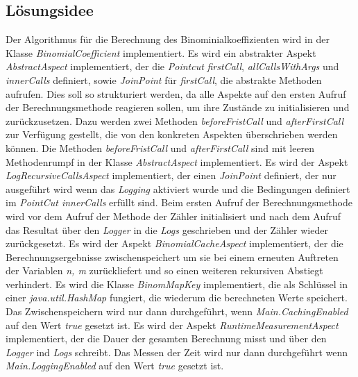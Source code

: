 \documentclass[11pt, a4paper, twoside]{article}   	%
\begin{document}
\subsection{Lösungsidee} 
Der Algorithmus für die Berechnung des Binominialkoeffizienten wird in der Klasse \emph{BinomialCoefficient} implementiert.
\newline
\newline
Es wird ein abstrakter Aspekt \emph{AbstractAspect} implementiert, der die \emph{Pointcut} \emph{firstCall}, \emph{allCallsWithArgs} und \emph{innerCalls} definiert, sowie \emph{JoinPoint} für \emph{firstCall}, die abstrakte Methoden aufrufen. Dies soll so strukturiert werden, da alle Aspekte auf den ersten Aufruf der Berechnungsmethode reagieren sollen, um ihre Zustände zu initialisieren und zurückzusetzen. Dazu werden zwei Methoden \emph{beforeFristCall} und \emph{afterFirstCall} zur Verfügung gestellt, die von den konkreten Aspekten überschrieben werden können. Die Methoden \emph{beforeFristCall} und \emph{afterFirstCall} sind mit leeren Methodenrumpf in der Klasse \emph{AbstractAspect} implementiert. 
\newline
\newline
Es wird der Aspekt \emph{LogRecursiveCallsAspect} implementiert, der einen \emph{JoinPoint} definiert, der nur ausgeführt wird wenn das \emph{Logging} aktiviert wurde und die Bedingungen definiert im \emph{PointCut innerCalls} erfüllt sind. Beim ersten Aufruf der Berechnungsmethode wird vor dem Aufruf der Methode der Zähler initialisiert und nach dem Aufruf das Resultat über den \emph{Logger} in die \emph{Logs} geschrieben und der Zähler wieder zurückgesetzt.
\newline
\newline
Es wird der Aspekt \emph{BinomialCacheAspect} implementiert, der die Berechnungsergebnisse zwischenspeichert um sie bei einem erneuten Auftreten der Variablen \emph{n, m} zurückliefert und so einen weiteren rekursiven Abstiegt verhindert. Es wird die Klasse \emph{BinomMapKey} implementiert, die als Schlüssel in einer \emph{java.util.HashMap} fungiert, die wiederum die berechneten Werte speichert. Das Zwischenspeichern wird nur dann durchgeführt, wenn \emph{Main.CachingEnabled} auf den Wert \emph{true} gesetzt ist.
\newline
\newline
Es wird der Aspekt \emph{RuntimeMeasurementAspect} implementiert, der die Dauer der gesamten Berechnung misst und über den \emph{Logger} ind \emph{Logs} schreibt. Das Messen der Zeit wird nur dann durchgeführt wenn \emph{Main.LoggingEnabled} auf den Wert \emph{true} gesetzt ist.
\end{document}
